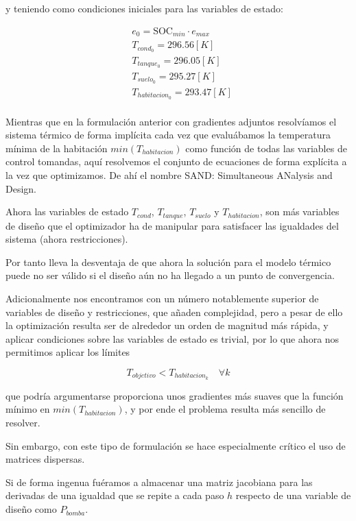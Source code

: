 y teniendo como condiciones iniciales para las variables de estado:

\begin{align}
	 & e_0 = \text{SOC}_{min} \cdot e_{max} \\
	 & T_{cond_0} = 296.56 [K]              \\
	 & T_{tanque_0} = 296.05[K]             \\
	 & T_{suelo_0} = 295.27[K]              \\
	 & T_{habitacion_0} = 293.47[K]         \\
\end{align}


Mientras que en la formulación anterior con gradientes adjuntos resolvíamos el
sistema térmico de forma implícita cada vez que evaluábamos la temperatura
mínima de la habitación $min(T_{habitacion})$ como función de todas las
variables de control tomandas, aquí resolvemos el conjunto de ecuaciones de
forma explícita a la vez que optimizamos. De ahí el nombre SAND: Simultaneous
ANalysis and Design.

Ahora las variables de estado $T_{cond}$, $T_{tanque}$, $T_{suelo}$ y
$T_{habitacion}$, son más variables de diseño que el optimizador ha de
manipular para satisfacer las igualdades del sistema (ahora restricciones).

Por tanto lleva la desventaja de que ahora la solución para el modelo térmico
puede no ser válido si el diseño aún no ha llegado a un punto de convergencia.

Adicionalmente nos encontramos con un número notablemente superior de variables
de diseño y restricciones, que añaden complejidad, pero a pesar de ello la
optimización resulta ser de alrededor un orden de magnitud más rápida, y
aplicar condiciones sobre las variables de estado es trivial, por lo que ahora
nos permitimos aplicar los límites

\begin{equation*}
	T_{objetivo} < T_{habitacion_k} \quad \forall k
\end{equation*}

que podría argumentarse proporciona unos gradientes más suaves que la función
mínimo en $min(T_{habitacion})$, y por ende el problema resulta más sencillo de
resolver.

Sin embargo, con este tipo de formulación se hace especialmente crítico el uso
de matrices dispersas.

Si de forma ingenua fuéramos a almacenar una
matriz jacobiana para las derivadas de una igualdad que se repite a cada paso
$h$ respecto de una variable de diseño como $P_{bomba}$.

